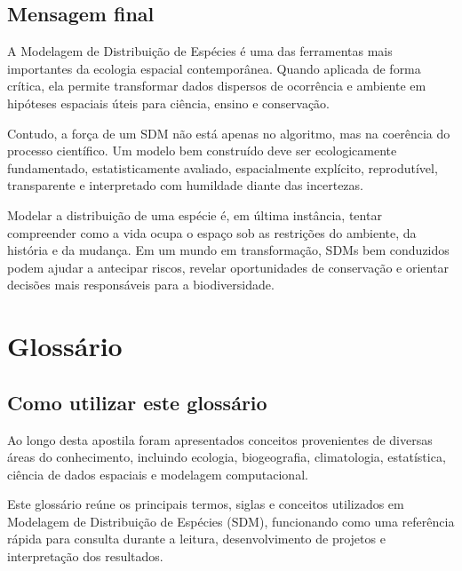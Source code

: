 \documentclass{ueap-sdm}
\begin{document}
\section{Mensagem final}

A Modelagem de Distribuição de Espécies é uma das ferramentas mais importantes da ecologia espacial contemporânea. Quando aplicada de forma crítica, ela permite transformar dados dispersos de ocorrência e ambiente em hipóteses espaciais úteis para ciência, ensino e conservação.

Contudo, a força de um SDM não está apenas no algoritmo, mas na coerência do processo científico. Um modelo bem construído deve ser ecologicamente fundamentado, estatisticamente avaliado, espacialmente explícito, reprodutível, transparente e interpretado com humildade diante das incertezas.

\begin{conceito}[title={\faLeaf\quad Consideração final}]
	Modelar a distribuição de uma espécie é, em última instância, tentar compreender como a vida ocupa o espaço sob as restrições do ambiente, da história e da mudança. Em um mundo em transformação, SDMs bem conduzidos podem ajudar a antecipar riscos, revelar oportunidades de conservação e orientar decisões mais responsáveis para a biodiversidade.
\end{conceito}

\chapter*{Glossário}

\section*{Como utilizar este glossário}

Ao longo desta apostila foram apresentados conceitos provenientes de diversas
áreas do conhecimento, incluindo ecologia, biogeografia, climatologia,
estatística, ciência de dados espaciais e modelagem computacional.

Este glossário reúne os principais termos, siglas e conceitos utilizados em
Modelagem de Distribuição de Espécies (SDM), funcionando como uma referência
rápida para consulta durante a leitura, desenvolvimento de projetos e
interpretação dos resultados.
\end{document}
